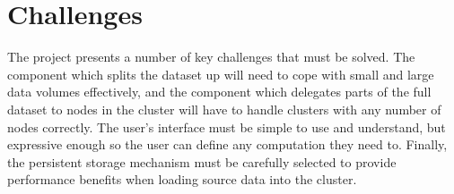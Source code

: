 \section{Challenges}
The project presents a number of key challenges that must be solved. The component which splits the dataset up will need to cope with small and large data volumes effectively, and the component which delegates parts of the full dataset to nodes in the cluster will have to handle clusters with any number of nodes correctly. The user's interface must be simple to use and understand, but expressive enough so the user can define any computation they need to. Finally, the persistent storage mechanism must be carefully selected to provide performance benefits when loading source data into the cluster.
